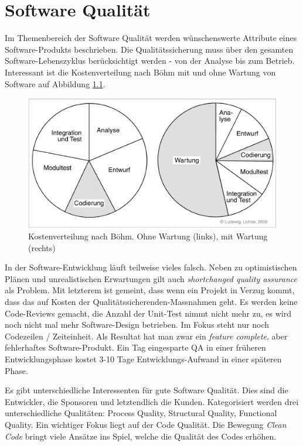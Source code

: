 \chapter{Software Qualität}

Im Themenbereich der Software Qualität werden wünschenswerte Attribute eines Software-Produkts beschrieben. Die Qualitätssicherung muss über den gesamten Software-Lebenszyklus berücksichtigt werden - von der Analyse bis zum Betrieb. Interessant ist die Kostenverteilung nach Böhm mit und ohne Wartung von Software auf Abbildung \ref{fig:kostenverteilung-sw-entwicklung-nach-boehm}.

\begin{figure}[h!]
\centering
\includegraphics[width=0.8\linewidth]{fig/kostenverteilung-sw-entwicklung-nach-boehm}
\caption{Kostenverteilung nach Böhm. Ohne Wartung (links), mit Wartung (rechts)}
\label{fig:kostenverteilung-sw-entwicklung-nach-boehm}
\end{figure}

In der Software-Entwicklung läuft teilweise vieles falsch. Neben zu optimistischen Plänen und unrealistischen Erwartungen gilt auch \emph{shortchanged quality assurance} als Problem. Mit letzterem ist gemeint, dass wenn ein Projekt in Verzug kommt, dass das auf Kosten der Qualitätssicherenden-Massnahmen geht. Es werden keine Code-Reviews gemacht, die Anzahl der Unit-Test nimmt nicht mehr zu, es wird noch nicht mal mehr Software-Design betrieben. Im Fokus steht nur noch Codezeilen / Zeiteinheit. Als Resultat hat man zwar ein \emph{feature complete}, aber fehlerhaftes Software-Produkt. Ein Tag eingesparte QA in einer früheren Entwicklungsphase kostet 3-10 Tage Entwicklungs-Aufwand in einer späteren Phase.

Es gibt unterschiedliche Interessenten für gute Software Qualität. Dies sind die Entwickler, die Sponsoren und letztendlich die Kunden. Kategorisiert werden drei unterschiedliche Qualitäten: Process Quality, Structural Quality, Functional Quality. Ein wichtiger Fokus liegt auf der Code Qualität. Die Bewegung \emph{Clean Code} bringt viele Ansätze ins Spiel, welche die Qualität des Codes erhöhen.

